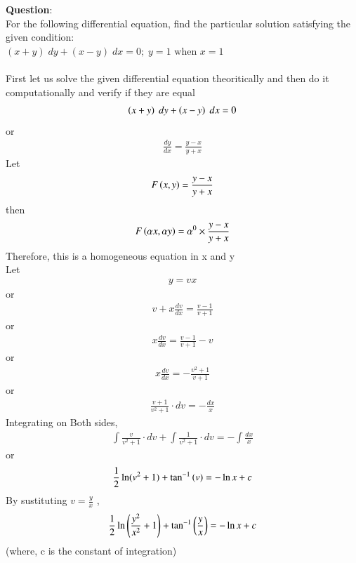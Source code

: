 \documentclass[journal]{IEEEtran}
\begin{document}
\textbf{Question}:\\
For the following differential equation, find the particular solution satisfying the given condition:\\
$(x + y)\;dy + (x - y)\;dx = 0;\;y=1 \text{ when } x=1$\\
\solution \\
First let us solve the given differential equation theoritically and then do it computationally and verify if they are equal \\
\begin{align}
    {\ensuremath{\left(x + y\right)}\;dy + \ensuremath{\left(x - y\right)}\;dx = 0}
\end{align}
or \begin{align}
    \frac{dy}{dx}=\frac{y-x}{y+x}
\end{align}
Let \begin{align}
    F\left(x,y\right)=\frac{y-x}{y+x}
\end{align}
then \begin{align}
    F\left(\alpha x,\alpha y\right)={\alpha}^0 \times \frac{y-x}{y+x}
\end{align}
Therefore, this is a homogeneous equation in x and y\\
Let \begin{align}
    y = v x 
\end{align}
or \begin{align}
    v + x \frac{dv}{dx} = \frac{v-1}{v+1}
\end{align}
or \begin{align}
    x\frac{dv}{dx}=\frac{v-1}{v+1}-v
\end{align}
or \begin{align}
    x\frac{dv}{dx}=-\frac{v^2+1}{v+1}
\end{align}
or \begin{align}
    \frac{v+1}{v^2+1}\cdot dv = -\frac{dx}{x}
\end{align}
Integrating on Both sides, \begin{align}
   \int \frac{v}{v^2+1}\cdot dv + \int\frac{1}{v^2+1}\cdot dv = -\int \frac{dx}{x}
\end{align}
or \begin{align}
    \frac{1}{2}\ln(v^2+1) + \tan^{-1}{\left(v\right)} = - \ln{x} + c
\end{align}
By sustituting $v=\frac{y}{x}$ ,
\begin{align}
    \frac{1}{2}\ln \left(\frac{y^2}{x^2}+1\right) + \tan^{-1}{\left(\frac{y}{x}\right)} = - \ln{x} + c  
    \label{0.12}
\end{align}
(where, c is the constant of integration)
\end{document}
